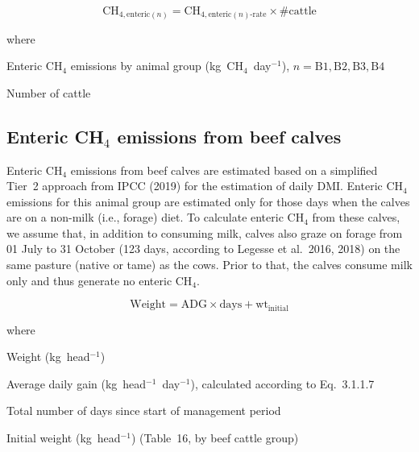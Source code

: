 \begin{equation}
    \mathrm{CH}_{4,\mathrm{enteric}(n)} =
        \mathrm{CH}_{4,\mathrm{enteric}(n)\mathrm{\text{-}rate}}
        \times \#\mathrm{cattle}
    \tag{Eq.\ 3.1.1.18}
\end{equation}

\noindent where
\begin{description}[font=\normalfont, leftmargin=9em, style=sameline, nosep]
    \item[$\mathrm{CH}_{4,\mathrm{enteric}(n)}$] Enteric CH$_4$ emissions by animal
          group (kg~CH$_4$~day$^{-1}$), $n = \mathrm{B1, B2, B3, B4}$
    \item[$\#\mathrm{cattle}$] Number of cattle
\end{description}

\subsection{Enteric CH\texorpdfstring{$_4$}{4} emissions from beef calves}
\label{subsec:beef-calves}

Enteric CH$_4$ emissions from beef calves are estimated based on a simplified Tier~2
approach from IPCC (2019) for the estimation of daily DMI. Enteric CH$_4$ emissions for
this animal group are estimated only for those days when the calves are on a non-milk
(i.e., forage) diet. To calculate enteric CH$_4$ from these calves, we assume that, in
addition to consuming milk, calves also graze on forage from 01 July to 31 October
(123 days, according to Legesse et al.\ 2016, 2018) on the same pasture (native or tame)
as the cows. Prior to that, the calves consume milk only and thus generate no enteric
CH$_4$.

\begin{equation}
    \mathrm{Weight} = \mathrm{ADG} \times \mathrm{days} + \mathrm{wt}_{\mathrm{initial}}
    \tag{Eq.\ 3.1.2.1}
\end{equation}

\noindent where
\begin{description}[font=\normalfont, leftmargin=9em, style=sameline, nosep]
    \item[$\mathrm{Weight}$] Weight (kg~head$^{-1}$)
    \item[$\mathrm{ADG}$] Average daily gain (kg~head$^{-1}$~day$^{-1}$), calculated
          according to Eq.~3.1.1.7
    \item[$\mathrm{days}$] Total number of days since start of management period
    \item[$\mathrm{wt}_{\mathrm{initial}}$] Initial weight (kg~head$^{-1}$) (Table~16,
          by beef cattle group)
\end{description}

